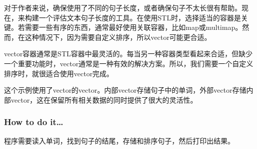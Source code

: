 
对于作者来说，确保使用了不同的句子长度，或者确保句子不太长很有帮助。现在，来构建一个评估文本句子长度的工具。在使用STL时，选择适当的容器是关键。若需要一些有序的东西，通常最好使用关联容器，比如map或multimap。然而，在这种情况下，因为需要自定义排序，所以vector可能更合适。

vector容器通常是STL容器中最灵活的。每当另一种容器类型看起来合适，但缺少一个重要功能时，vector通常是一种有效的解决方案。所以，我们需要一个自定义排序时，就很适合使用vector完成。

这个示例使用了vector的vector。内部vector存储句子中的单词，外部vector存储内部vector，这在保留所有相关数据的同时提供了很大的灵活性。

\subsubsection{How to do it…}

程序需要读入单词，找到句子的结尾，存储和排序句子，然后打印出结果。

